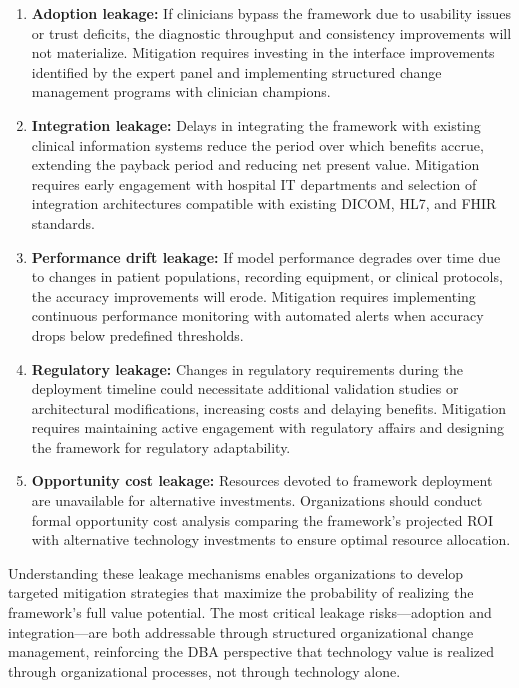 \begin{enumerate}
    \item \textbf{Adoption leakage:} If clinicians bypass the framework due to usability issues or trust deficits, the diagnostic throughput and consistency improvements will not materialize. Mitigation requires investing in the interface improvements identified by the expert panel and implementing structured change management programs with clinician champions.

    \item \textbf{Integration leakage:} Delays in integrating the framework with existing clinical information systems reduce the period over which benefits accrue, extending the payback period and reducing net present value. Mitigation requires early engagement with hospital IT departments and selection of integration architectures compatible with existing DICOM, HL7, and FHIR standards.

    \item \textbf{Performance drift leakage:} If model performance degrades over time due to changes in patient populations, recording equipment, or clinical protocols, the accuracy improvements will erode. Mitigation requires implementing continuous performance monitoring with automated alerts when accuracy drops below predefined thresholds.

    \item \textbf{Regulatory leakage:} Changes in regulatory requirements during the deployment timeline could necessitate additional validation studies or architectural modifications, increasing costs and delaying benefits. Mitigation requires maintaining active engagement with regulatory affairs and designing the framework for regulatory adaptability.

    \item \textbf{Opportunity cost leakage:} Resources devoted to framework deployment are unavailable for alternative investments. Organizations should conduct formal opportunity cost analysis comparing the framework's projected ROI with alternative technology investments to ensure optimal resource allocation.
\end{enumerate}

Understanding these leakage mechanisms enables organizations to develop targeted mitigation strategies that maximize the probability of realizing the framework's full value potential. The most critical leakage risks---adoption and integration---are both addressable through structured organizational change management, reinforcing the DBA perspective that technology value is realized through organizational processes, not through technology alone.

